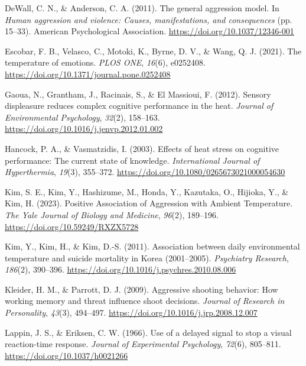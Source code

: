 \documentclass[
  man,
  floatsintext,
  longtable,
  nolmodern,
  notxfonts,
  notimes,
  colorlinks=true,linkcolor=blue,citecolor=blue,urlcolor=blue]{apa7}
\newlength{\cslhangindent}
\newenvironment{CSLReferences}[2] %
 {\begin{list}{}{%
  \setlength{\itemindent}{0pt}
  \setlength{\leftmargin}{0pt}
  \setlength{\parsep}{0pt}
  \ifodd #1
   \setlength{\leftmargin}{\cslhangindent}
   \setlength{\itemindent}{-1\cslhangindent}
  \fi
  \setlength{\itemsep}{#2\baselineskip}}}
 {\end{list}}
\begin{document}
\begin{CSLReferences}{1}{0}
DeWall, C. N., \& Anderson, C. A. (2011). The general aggression model.
In \emph{Human aggression and violence: {Causes}, manifestations, and
consequences} (pp. 15--33). American Psychological Association.
\url{https://doi.org/10.1037/12346-001}

Escobar, F. B., Velasco, C., Motoki, K., Byrne, D. V., \& Wang, Q. J.
(2021). The temperature of emotions. \emph{PLOS ONE}, \emph{16}(6),
e0252408. \url{https://doi.org/10.1371/journal.pone.0252408}

Gaoua, N., Grantham, J., Racinais, S., \& El Massioui, F. (2012).
Sensory displeasure reduces complex cognitive performance in the heat.
\emph{Journal of Environmental Psychology}, \emph{32}(2), 158--163.
\url{https://doi.org/10.1016/j.jenvp.2012.01.002}

Hancock, P. A., \& Vasmatzidis, I. (2003). Effects of heat stress on
cognitive performance: The current state of knowledge.
\emph{International Journal of Hyperthermia}, \emph{19}(3), 355--372.
\url{https://doi.org/10.1080/0265673021000054630}

Kim, S. E., Kim, Y., Hashizume, M., Honda, Y., Kazutaka, O., Hijioka,
Y., \& Kim, H. (2023). Positive {Association} of {Aggression} with
{Ambient Temperature}. \emph{The Yale Journal of Biology and Medicine},
\emph{96}(2), 189--196. \url{https://doi.org/10.59249/RXZX5728}

Kim, Y., Kim, H., \& Kim, D.-S. (2011). Association between daily
environmental temperature and suicide mortality in {Korea} (2001--2005).
\emph{Psychiatry Research}, \emph{186}(2), 390--396.
\url{https://doi.org/10.1016/j.psychres.2010.08.006}

Kleider, H. M., \& Parrott, D. J. (2009). Aggressive shooting behavior:
{How} working memory and threat influence shoot decisions. \emph{Journal
of Research in Personality}, \emph{43}(3), 494--497.
\url{https://doi.org/10.1016/j.jrp.2008.12.007}

Lappin, J. S., \& Eriksen, C. W. (1966). Use of a delayed signal to stop
a visual reaction-time response. \emph{Journal of Experimental
Psychology}, \emph{72}(6), 805--811.
\url{https://doi.org/10.1037/h0021266}


\end{CSLReferences}
\end{document}
